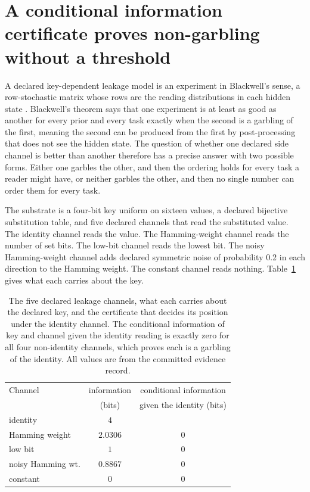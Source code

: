 \documentclass[aps,pre,reprint,nofootinbib]{revtex4-2}
\begin{document}
\section{A conditional information certificate proves non-garbling
without a threshold}
\label{sec:cr1}

A declared key-dependent leakage model is an experiment in Blackwell's
sense, a row-stochastic matrix whose rows are the reading
distributions in each hidden state \cite{Blackwell1953}.  Blackwell's
theorem says that one experiment is at least as good as another for
every prior and every task exactly when the second is a garbling of
the first, meaning the second can be produced from the first by
post-processing that does not see the hidden state.  The question of
whether one declared side channel is better than another therefore has
a precise answer with two possible forms.  Either one garbles the
other, and then the ordering holds for every task a reader might have,
or neither garbles the other, and then no single number can order them
for every task.

The substrate is a four-bit key uniform on sixteen values, a declared
bijective substitution table, and five declared channels that read the
substituted value.  The identity channel reads the value.  The
Hamming-weight channel reads the number of set bits.  The low-bit
channel reads the lowest bit.  The noisy Hamming-weight channel adds
declared symmetric noise of probability 0.2 in each direction to the
Hamming weight.  The constant channel reads nothing.  Table~\ref{tab:cr1}
gives what each carries about the key.

\begin{table}[t]
\caption{The five declared leakage channels, what each carries about
the declared key, and the certificate that decides its position under
the identity channel.  The conditional information of key and channel
given the identity reading is exactly zero for all four non-identity
channels, which proves each is a garbling of the identity.  All
values are from the committed evidence record.}
\label{tab:cr1}
\begin{ruledtabular}
\footnotesize
\begin{tabular}{lcc}
Channel & information & conditional information \\
        & (bits)      & given the identity (bits) \\
\colrule
identity           & $4$        &          \\
Hamming weight     & $2.0306$   & $0$ \\
low bit            & $1$        & $0$ \\
noisy Hamming wt.  & $0.8867$   & $0$ \\
constant           & $0$        & $0$ \\
\end{tabular}
\end{ruledtabular}
\end{table}
\end{document}
